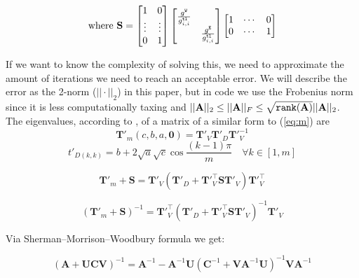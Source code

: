 \documentclass[journal,onecolumn]{IEEEtran}
\newcommand{\vtt}[1]{%
  \text{\normalfont\ttfamily\detokenize{#1}}%
}
\begin{document}
\begin{equation}
\text{where } \mathbf{S} = \begin{bmatrix} 1 & 0 \\  \vdots & \vdots \\ 0 & 1 \end{bmatrix}\begin{bmatrix} 
    \frac{g^\vtt{W}}{g^\vtt{tl}_{i,i}} \\ & \frac{g^\vtt{E}}{g^\vtt{tl}_{i,i}}
\end{bmatrix} \begin{bmatrix} 1 & \cdots & 0 \\ 0 & \cdots & 1 \end{bmatrix}
\end{equation}

If we want to know the complexity of solving this, we need to approximate the amount of iterations we need to reach an acceptable error. We will describe the error as the 2-norm ($||\cdot||_2$) in this paper, but in code we use the Frobenius norm since it is less computationally taxing and $||\mathbf{A}||_2 \le ||\mathbf{A}||_F \le \sqrt{\vtt{rank}(\mathbf{A})}||\mathbf{A}||_2$. \\  %

The eigenvalues, according to \cite{Kouachi2006}, of a matrix of a similar form to (\ref{eq:m}) are
$$\mathbf{T'}_m (c,b,a,\mathbf{0}) = \mathbf{T'}_V \mathbf{T'}_D \mathbf{T'}_V^{-1}$$
$$t'_{D(k,k)} = b + 2\sqrt{a}\sqrt{c}\cos{\frac{(k-1)\pi}{m}} \quad \forall k \in [1, m]$$  %

\iffalse %
    $$\mathbf{T'}_m + \mathbf{S} = \mathbf{T'}_V \left( \mathbf{T'}_D + \mathbf{T'}^\top_V \mathbf{S} \mathbf{T'}_V \right) \mathbf{T'}^\top_V$$
    
    $$\left( \mathbf{T'}_m + \mathbf{S} \right)^{-1} = \mathbf{T'}^\top_V \left( \mathbf{T'}_D + \mathbf{T'}^\top_V \mathbf{S} \mathbf{T'}_V \right)^{-1} \mathbf{T'}_V$$
    
    Via Sherman–Morrison–Woodbury formula we get:
    
    $$\left( \mathbf{A} + \mathbf{U}\mathbf{C}\mathbf{V} \right)^{-1} = \mathbf{A}^{-1} - \mathbf{A}^{-1}\mathbf{U}\left( \mathbf{C}^{-1} + \mathbf{V}\mathbf{A}^{-1}\mathbf{U} \right)^{-1}\mathbf{V}\mathbf{A}^{-1}$$
    
\end{document}
